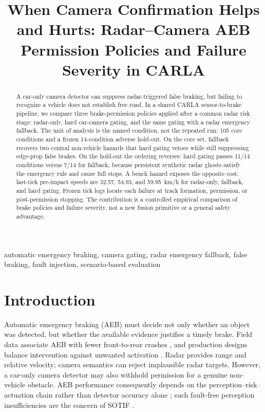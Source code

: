 \documentclass[conference]{IEEEtran}
\title{When Camera Confirmation Helps and Hurts: Radar--Camera AEB Permission Policies and Failure Severity in CARLA}
\author{
\IEEEauthorblockN{Mai Viet Hoang and Duc An Pham}
\IEEEauthorblockA{\textit{Hanoi University of Science and Technology}\\
Hanoi, Vietnam\\hoangmai04222@gmail.com}
}
\begin{document}
\maketitle

\begin{abstract}
A car-only camera detector can suppress radar-triggered false braking, but
failing to recognize a vehicle does not establish free road. In a shared CARLA
sensor-to-brake pipeline, we compare three brake-permission policies applied
after a common radar risk stage: radar-only, hard car-camera gating, and the
same gating with a radar emergency fallback. The unit of analysis is the named
condition, not the repeated run: 105 core conditions and a frozen 14-condition
adverse hold-out. On the core set, fallback recovers two central
non-vehicle hazards that hard gating vetoes while still suppressing
edge-prop false brakes. On the hold-out the ordering reverses: hard gating
passes 11/14 conditions versus 7/14 for fallback, because persistent synthetic
radar ghosts satisfy the emergency rule and cause full stops. A bench hazard
exposes the opposite cost: last-tick pre-impact speeds are 32.57, 54.93, and
59.95~km/h for radar-only, fallback, and hard gating. Frozen tick logs locate
each failure at track formation, permission, or post-permission stopping.
The contribution is a controlled empirical comparison of brake policies and
failure severity, not a new fusion primitive or a general safety advantage.
\end{abstract}
\begin{IEEEkeywords}
automatic emergency braking, camera gating, radar emergency fallback,
false braking, fault injection, scenario-based evaluation
\end{IEEEkeywords}

\section{Introduction}
Automatic emergency braking (AEB) must decide not only whether an object was
detected, but whether the available evidence justifies a timely brake. Field
data associate AEB with fewer front-to-rear crashes \cite{cicchino2017effectiveness},
and production designs balance intervention against unwanted activation
\cite{coelingh2010collision}. Radar
provides range and relative velocity; camera semantics can reject implausible
radar targets. However, a car-only camera detector may also withhold permission
for a genuine non-vehicle obstacle. AEB performance consequently depends on the
perception--risk--actuation chain rather than detector accuracy alone
\cite{yang2022aebreview}; such fault-free perception insufficiencies are the
concern of SOTIF \cite{iso21448}.
\end{document}
